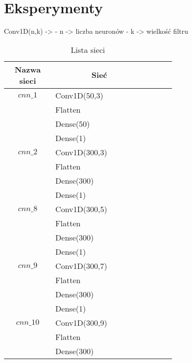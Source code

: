 \newpage %
\section{Eksperymenty}


Conv1D(n,k) ->
- n -> liczba neuronów
- k -> wielkość filtru

\begin{longtable}{| c | m{0.58\linewidth} | r | m{0.1\linewidth} |}
    \caption{Lista sieci}                       \\
    \hline
    Nazwa sieci & \multicolumn{1}{c|}{Sieć}     \\ \hline\hline \endfirsthead

    \endfoot
    \hline \endlastfoot



    $cnn\_1$    & Conv1D(50,3)                  \\
                & Flatten                       \\
                & Dense(50)                     \\
                & Dense(1)                      \\ \hline
    $cnn\_2$    & Conv1D(300,3)                 \\
                & Flatten                       \\
                & Dense(300)                    \\
                & Dense(1)                      \\ \hline
    $cnn\_8$    & Conv1D(300,5)                 \\
                & Flatten                       \\
                & Dense(300)                    \\
                & Dense(1)                      \\ \hline
    $cnn\_9$    & Conv1D(300,7)                 \\
                & Flatten                       \\
                & Dense(300)                    \\
                & Dense(1)                      \\ \hline
    $cnn\_10$   & Conv1D(300,9)                 \\
                & Flatten                       \\
                & Dense(300)                    \\

\end{longtable}
